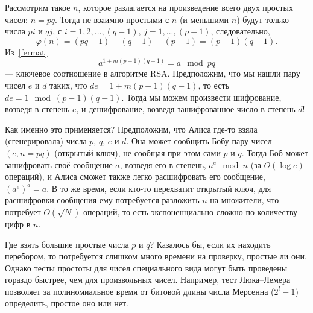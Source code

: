 \documentclass{book}
\begin{document}
Рассмотрим такое $n$, которое разлагается на произведение всего двух простых чисел: $n = pq$. Тогда
не взаимно простыми с $n$ (и меньшими $n$) будут только числа $pi$ и $q j$, с $i = 1, 2, ..., (q -
1)$, $j = 1,..., (p  - 1)$, следовательно,
\begin{equation}
    \varphi(n) = (p q - 1) - (q - 1) - (p - 1) = (p - 1)(q - 1).
\end{equation}
Из~\ref{fermat}
\begin{equation}
    a^{1 + m (p - 1) (q - 1)} = a \mod pq
\end{equation}
--- ключевое соотношение в алгоритме RSA. Предположим, что мы нашли пару чисел $e$ и $d$ таких, что
$de = 1 + m (p - 1) (q - 1)$, то есть $de = 1 \mod (p - 1) (q - 1)$. Тогда мы можем произвести
шифрование, возведя в степень $e$, и дешифрование, возведя зашифрованное число в степень $d$!

Как именно это применяется? Предположим, что Алиса где-то взяла (сгенерировала) числа $p$, $q$, $e$
и $d$. Она может сообщить Бобу пару чисел $(e, n = pq)$ (открытый ключ), не сообщая при этом сами
$p$ и $q$. Тогда Боб может зашифровать своё сообщение $a$, возведя его в степень, $a^e \mod n$ (за
$O(\log e)$ операций), и Алиса сможет также легко расшифровать его сообщение, $(a^e)^d = a$. В то
же время, если кто-то перехватит открытый ключ, для расшифровки сообщения ему потребуется разложить
$n$ на множители, что потребует $O(\sqrt{N})$ операций, то есть экспоненциально сложно по
количеству цифр в $n$.

Где взять большие простые числа $p$ и $q$? Казалось бы, если их находить перебором, то потребуется
слишком много времени на проверку, простые ли они. Однако тесты простоты для чисел
специального вида могут быть проведены гораздо быстрее, чем для произвольных чисел. Например, тест
Люка--Лемера позволяет за полиномиальное время от битовой длины числа Мерсенна ($2^l - 1$)
определить, простое оно или нет.
\end{document}
